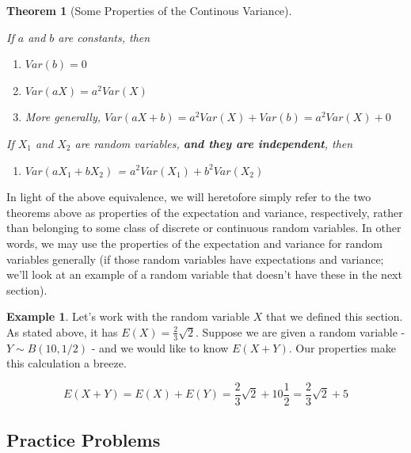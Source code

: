 \documentclass[
]{book}
\providecommand{\tightlist}{%
  \setlength{\itemsep}{0pt}\setlength{\parskip}{0pt}}
\newtheorem{theorem}{Theorem}[chapter]
\theoremstyle{definition}
\theoremstyle{definition}
\newtheorem{example}{Example}[chapter]
\theoremstyle{definition}
\theoremstyle{definition}
\theoremstyle{remark}
\begin{document}
\begin{theorem}[Some Properties of the Continous Variance]
\protect\hypertarget{thm:contvar}{}\label{thm:contvar}

If \(a\) and \(b\) are constants, then

\begin{enumerate}
\def\labelenumi{\arabic{enumi}.}
\item
  \(Var(b) = 0\)
\item
  \(Var(aX) = a^2Var(X)\)
\item
  More generally, \(Var(aX + b) = a^2Var(X) + Var(b) = a^2Var(X) + 0\)
\end{enumerate}

If \(X_1\) and \(X_2\) are random variables, \textbf{and they are independent}, then

\begin{enumerate}
\def\labelenumi{\arabic{enumi}.}
\setcounter{enumi}{3}
\tightlist
\item
  \(Var(aX_1 + bX_2)\) = \(a^2Var(X_1) + b^2Var(X_2)\)
\end{enumerate}

\end{theorem}

In light of the above equivalence, we will heretofore simply refer to the two theorems above as properties of the expectation and variance, respectively, rather than belonging to some class of discrete or continuous random variables. In other words, we may use the properties of the expectation and variance for random variables generally (if those random variables have expectations and variance; we'll look at an example of a random variable that doesn't have these in the next section).

\begin{example}
Let's work with the random variable \(X\) that we defined this section. As stated above, it has \(E(X) = \frac{2}{3}\sqrt{2}\). Suppose we are given a random variable - \(Y \sim B(10,1/2)\) - and we would like to know \(E(X + Y)\). Our properties make this calculation a breeze.

\[
E(X + Y) = E(X) + E(Y) = \frac{2}{3}\sqrt{2} + 10\frac{1}{2} = \frac{2}{3}\sqrt{2} + 5
\]
\end{example}

\subsection{Practice Problems}\label{practice-problems-2}
\end{document}
